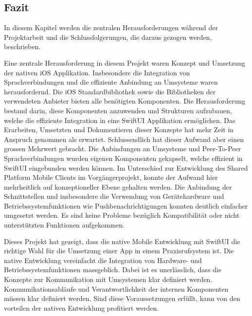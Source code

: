 \subsection{Fazit}

In diesem Kapitel werden die zentralen Herausforderungen während der Projektarbeit und die Schlussfolgerungen, die daraus gezogen werden, beschrieben.

Eine zentrale Herausforderung in diesem Projekt waren Konzept und Umsetzung der nativen iOS Applikation.
Insbesondere die Integration von Sprachverbindungen und die effiziente Anbindung an Umsysteme waren herausfordernd.
Die iOS Standardbibliothek sowie die Bibliotheken der verwendeten Anbieter bieten alle benötigten Komponenten.
Die Herausforderung bestand darin, diese Komponenten anzuwenden und Strukturen aufzubauen, welche die effiziente Integration in eine SwiftUI Applikation ermöglichen.
Das Erarbeiten, Umsetzten und Dokumentieren dieser Konzepte hat mehr Zeit in Anspruch genommen als erwartet.
Schlussendlich hat dieser Aufwand aber einen grossen Mehrwert gebracht.
Die Anbindungen an Umsysteme und Peer-To-Peer Sprachverbindungen wurden eigenen Komponenten gekapselt, welche effizient in SwiftUI eingebunden werden können.
Im Unterschied zur Entwicklung des Shared Platform Mobile Clients im Vorgängerprojekt, konnte der Aufwand hier mehrheitlich auf konzeptioneller Ebene gehalten werden.
Die Anbindung der Schnittstellen und insbesondere die Verwendung von Gerätehardware und Betriebssystemfunktionen wie Pushbenachrichtigungen konnten deutlich einfacher umgesetzt werden.
Es sind keine Probleme bezüglich Kompatibilität oder nicht unterstützten Funktionen aufgekommen.

Dieses Projekt hat gezeigt, dass die native Mobile Entwicklung mit SwiftUI die richtige Wahl für die Umsetzung einer App in einem Praxisrufsystem ist.
Die native Entwicklung vereinfacht die Integration von Hardware- und Betriebssystemfunktionen massgeblich.
Dabei ist es unerlässlich, dass die Konzepte zur Kommunikation mit Umsystemen klar definiert werden.
Kommunikationsabläufe und Verantwortlichkeit der internen Komponenten müssen klar definiert werden.
Sind diese Voraussetzungen erfüllt, kann von den vorteilen der nativen Entwicklung profitiert werden.

